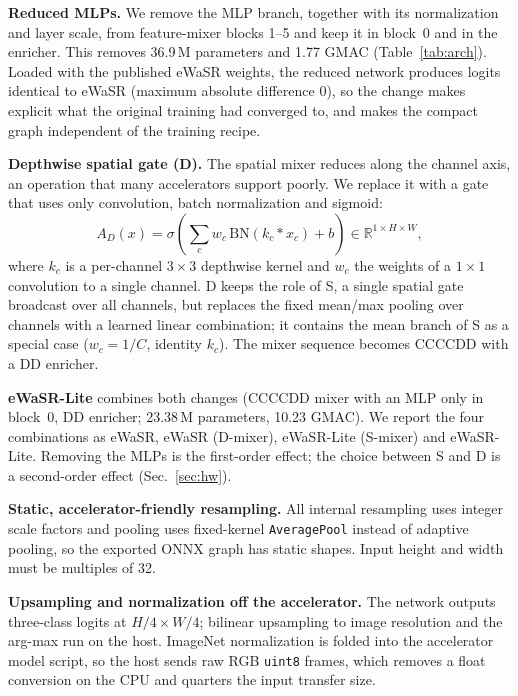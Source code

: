 \documentclass[conference]{IEEEtran}
\begin{document}
\textbf{Reduced MLPs.} We remove the MLP branch, together with its normalization and layer scale, from feature-mixer blocks 1--5 and keep it in block~0 and in the enricher. This removes 36.9\,M parameters and 1.77 GMAC (Table~\ref{tab:arch}). Loaded with the published eWaSR weights, the reduced network produces logits identical to eWaSR (maximum absolute difference 0), so the change makes explicit what the original training had converged to, and makes the compact graph independent of the training recipe.

\textbf{Depthwise spatial gate (D).} The spatial mixer reduces along the channel axis, an operation that many accelerators support poorly. We replace it with a gate that uses only convolution, batch normalization and sigmoid:
\begin{equation}
A_D(x)=\sigma\!\left(\textstyle\sum_{c} w_c\,\mathrm{BN}(k_c * x_c) + b\right)\in\mathbb{R}^{1\times H\times W},
\end{equation}
where $k_c$ is a per-channel $3\times3$ depthwise kernel and $w_c$ the weights of a $1\times1$ convolution to a single channel. D keeps the role of S, a single spatial gate broadcast over all channels, but replaces the fixed mean/max pooling over channels with a learned linear combination; it contains the mean branch of S as a special case ($w_c=1/C$, identity $k_c$). The mixer sequence becomes CCCCDD with a DD enricher.

\textbf{eWaSR-Lite} combines both changes (CCCCDD mixer with an MLP only in block~0, DD enricher; 23.38\,M parameters, 10.23 GMAC). We report the four combinations as eWaSR, eWaSR (D-mixer), eWaSR-Lite (S-mixer) and eWaSR-Lite. Removing the MLPs is the first-order effect; the choice between S and D is a second-order effect (Sec.~\ref{sec:hw}).

\textbf{Static, accelerator-friendly resampling.} All internal resampling uses integer scale factors and pooling uses fixed-kernel \texttt{AveragePool} instead of adaptive pooling, so the exported ONNX graph has static shapes. Input height and width must be multiples of 32.

\textbf{Upsampling and normalization off the accelerator.} The network outputs three-class logits at $H/4\times W/4$; bilinear upsampling to image resolution and the arg-max run on the host. ImageNet normalization is folded into the accelerator model script, so the host sends raw RGB \texttt{uint8} frames, which removes a float conversion on the CPU and quarters the input transfer size.
\end{document}
